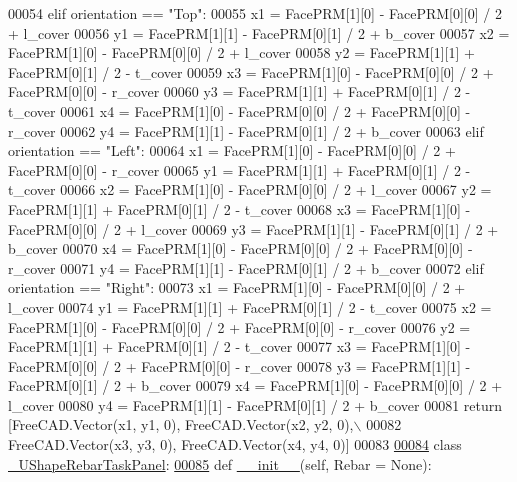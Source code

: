 \begin{DoxyCode}
00054     \textcolor{keywordflow}{elif} orientation == \textcolor{stringliteral}{"Top"}:
00055         x1 = FacePRM[1][0] - FacePRM[0][0] / 2 + l\_cover
00056         y1 = FacePRM[1][1] - FacePRM[0][1] / 2 + b\_cover
00057         x2 = FacePRM[1][0] - FacePRM[0][0] / 2 + l\_cover
00058         y2 = FacePRM[1][1] + FacePRM[0][1] / 2 - t\_cover
00059         x3 = FacePRM[1][0] - FacePRM[0][0] / 2 + FacePRM[0][0] - r\_cover
00060         y3 = FacePRM[1][1] + FacePRM[0][1] / 2 - t\_cover
00061         x4 = FacePRM[1][0] - FacePRM[0][0] / 2 + FacePRM[0][0] - r\_cover
00062         y4 = FacePRM[1][1] - FacePRM[0][1] / 2 + b\_cover
00063     \textcolor{keywordflow}{elif} orientation == \textcolor{stringliteral}{"Left"}:
00064         x1 = FacePRM[1][0] - FacePRM[0][0] / 2 + FacePRM[0][0] - r\_cover
00065         y1 = FacePRM[1][1] + FacePRM[0][1] / 2 - t\_cover
00066         x2 = FacePRM[1][0] - FacePRM[0][0] / 2 + l\_cover
00067         y2 = FacePRM[1][1] + FacePRM[0][1] / 2 - t\_cover
00068         x3 = FacePRM[1][0] - FacePRM[0][0] / 2 + l\_cover
00069         y3 = FacePRM[1][1] - FacePRM[0][1] / 2 + b\_cover
00070         x4 = FacePRM[1][0] - FacePRM[0][0] / 2 + FacePRM[0][0] - r\_cover
00071         y4 = FacePRM[1][1] - FacePRM[0][1] / 2 + b\_cover
00072     \textcolor{keywordflow}{elif} orientation == \textcolor{stringliteral}{"Right"}:
00073         x1 = FacePRM[1][0] - FacePRM[0][0] / 2 + l\_cover
00074         y1 = FacePRM[1][1] + FacePRM[0][1] / 2 - t\_cover
00075         x2 = FacePRM[1][0] - FacePRM[0][0] / 2 + FacePRM[0][0] - r\_cover
00076         y2 = FacePRM[1][1] + FacePRM[0][1] / 2 - t\_cover
00077         x3 = FacePRM[1][0] - FacePRM[0][0] / 2 + FacePRM[0][0] - r\_cover
00078         y3 = FacePRM[1][1] - FacePRM[0][1] / 2 + b\_cover
00079         x4 = FacePRM[1][0] - FacePRM[0][0] / 2 + l\_cover
00080         y4 = FacePRM[1][1] - FacePRM[0][1] / 2 + b\_cover
00081     \textcolor{keywordflow}{return} [FreeCAD.Vector(x1, y1, 0), FreeCAD.Vector(x2, y2, 0),\(\backslash\)
00082            FreeCAD.Vector(x3, y3, 0), FreeCAD.Vector(x4, y4, 0)]
00083 
\hypertarget{UShapeRebar_8py_source.tex_l00084}{}\hyperlink{classUShapeRebar_1_1__UShapeRebarTaskPanel}{00084} \textcolor{keyword}{class }\hyperlink{classUShapeRebar_1_1__UShapeRebarTaskPanel}{\_UShapeRebarTaskPanel}:
\hypertarget{UShapeRebar_8py_source.tex_l00085}{}\hyperlink{classUShapeRebar_1_1__UShapeRebarTaskPanel_a242486d55ca470c8e0629508ec295036}{00085}     \textcolor{keyword}{def }\hyperlink{classUShapeRebar_1_1__UShapeRebarTaskPanel_a242486d55ca470c8e0629508ec295036}{\_\_init\_\_}(self, Rebar = None):

\end{DoxyCode}
